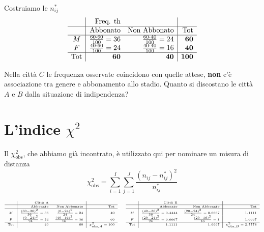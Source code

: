 \documentclass[
  11pt,
]{book}
\theoremstyle{mytheoremstyle}
\theoremstyle{mydefstyle}
\begin{document}
Costruiamo le \(n_{ij}^*\)
\[\begin{array}{c|rr|r}
 & \text{Freq. th} & &\\ \hline
 &\text{Abbonato} &\text{Non Abbonato} &\bf\text{Tot}\\
  \hline
  M & \frac{60 \cdot 60}{100}=36 & \frac{60 \cdot 40}{100}=24 & \bf60\\ 
  F & \frac{40 \cdot 60}{100}=24 & \frac{40 \cdot 40}{100}=16  &\bf40\\ \hline
  \bf\text{Tot} &\bf 60 &\bf 40 &\bf 100\\ 
\end{array}\]

Nella città \(C\) le frequenza osservate coincidono con quelle attese, \textbf{non} c'è
associazione tra genere e abbonamento allo stadio.
Quanto si discostano le città \(A\) e \(B\) dalla situazione di indipendenza?

\section{\texorpdfstring{L'indice \(\chi^2\)}{L'indice \textbackslash chi\^{}2}}\label{lindice-chi2}

Il \(\chi^2_\text{obs}\), che abbiamo già incontrato, è utilizzato qui per nominare un misura di distanza
\[\chi^2_\text{obs}=\sum_{i=1}^I\sum_{j=1}^J \frac{\left(n_{ij}-n_{ij}^*\right)^2}{n_{ij}^*}\]

\[\tiny
\begin{array}{c|rr|r}
 & \text{Città A} & &\\ \hline
 &\text{Abbonato} &\text{Non Abbonato} &\bf\text{Tot}\\
  \hline
   M & \frac{(60 - 36)^2}{36} = 36 & \frac{(0  - 24)^2}{24} = 24 & 40\\ 
   F & \frac{(0  - 24)^2}{24} = 24 & \frac{(40 - 16)^2}{16} = 36& 60\\ \hline
    \bf\text{Tot} & 40& 60 &\chi^2_{\text{obs},A}=100\\ 
\end{array}
\qquad
\begin{array}{c|rr|r}
 & \text{Città B} & &\\ \hline
 &\text{Abbonato} &\text{Non Abbonato} &\bf\text{Tot}\\
  \hline
  M & \frac{(40 - 36)^2}{36} = 0.4444 & \frac{(20 - 24)^2}{24} = 0.6667 &1.1111\\ 
  F & \frac{(20 - 24)^2}{24} = 0.6667 & \frac{(20 - 16)^2}{16} = 1 &1.6667 \\ \hline
    \bf\text{Tot} &1.1111 &1.6667 &\chi^2_{\text{obs},B}=2.7778\\ 
\end{array}
\]
\end{document}
